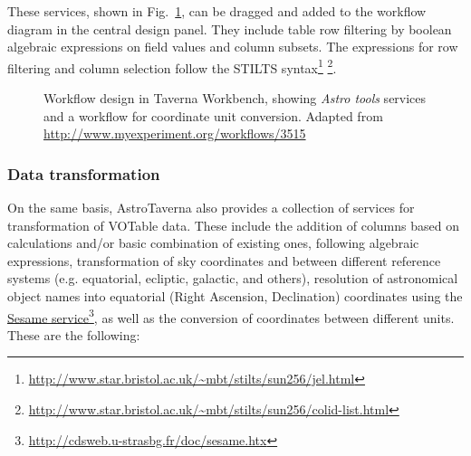 \documentclass[final,authoryear,5p,times,twocolumn]{elsarticle}
\newcommand{\urlsamefont}[1]{\urlstyle{same}\url{#1}}
\newcommand{\hrefnote}[2]{\href{#1}{#2}\footnote{\urlsamefont{#1}}}
\begin{document}
These services, shown in Fig.~\ref{fig:design}, can be dragged and added to the workflow diagram in the central design panel. They include table row filtering by boolean algebraic expressions on field values and column subsets.  The expressions for row filtering and column selection follow the STILTS syntax\footnote{\urlsamefont{http://www.star.bristol.ac.uk/~mbt/stilts/sun256/jel.html}} \footnote{\urlsamefont{http://www.star.bristol.ac.uk/~mbt/stilts/sun256/colid-list.html}}.

\begin{figure}[tb]
\centering 
{}
\caption{Workflow design in Taverna Workbench, showing \textit{Astro tools} services and a workflow for coordinate unit conversion. Adapted from \url{http://www.myexperiment.org/workflows/3515}}
\label{fig:design}
\end{figure}

\subsubsection{Data transformation}
\label{DataTransformation}

On the same basis, AstroTaverna also provides a collection of services for transformation of VOTable data. These include the addition of columns based on calculations and/or basic combination of existing ones, following algebraic expressions, transformation of sky coordinates and between different reference systems (e.g. equatorial, ecliptic, galactic, and others), resolution of astronomical object names into equatorial (Right Ascension, Declination) coordinates using the \hrefnote{http://cdsweb.u-strasbg.fr/doc/sesame.htx}{Sesame service}, as well as the conversion of coordinates between different units. These are the following:
\end{document}

